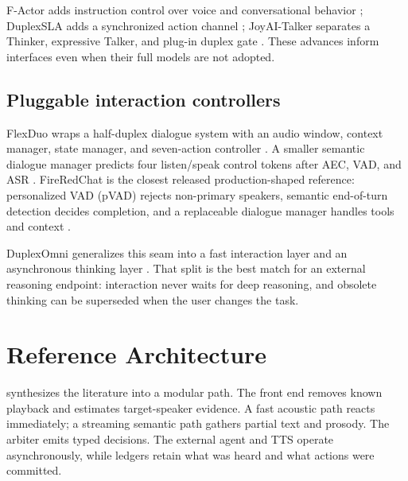 \documentclass[11pt]{article}
\begin{document}
F-Actor adds instruction control over voice and conversational behavior
\citep{zufle2026factor}; DuplexSLA adds a synchronized action channel
\citep{zhang2026duplexsla}; JoyAI-Talker separates a Thinker, expressive
Talker, and plug-in duplex gate \citep{bai2026joytalker}. These advances inform
interfaces even when their full models are not adopted.

\subsection{Pluggable interaction controllers}

FlexDuo wraps a half-duplex dialogue system with an audio window, context
manager, state manager, and seven-action controller
\citep{liao2025flexduo}. A smaller semantic dialogue manager predicts four
listen/speak control tokens after AEC, VAD, and ASR
\citep{zhang2025manager}. FireRedChat is the closest released production-shaped
reference: personalized VAD (pVAD) rejects non-primary speakers, semantic
end-of-turn detection decides completion, and a replaceable dialogue manager
handles tools and context \citep{chen2025firered}.

DuplexOmni generalizes this seam into a fast interaction layer and an
asynchronous thinking layer \citep{huang2026duplexomni}. That split is the
best match for an external reasoning endpoint: interaction never waits for deep
reasoning, and obsolete thinking can be superseded when the user changes the
task.

\section{Reference Architecture}

 synthesizes the literature into a modular path. The
front end removes known playback and estimates target-speaker evidence. A fast
acoustic path reacts immediately; a streaming semantic path gathers partial
text and prosody. The arbiter emits typed decisions. The external agent and TTS
operate asynchronously, while ledgers retain what was heard and what actions
were committed.
\end{document}
